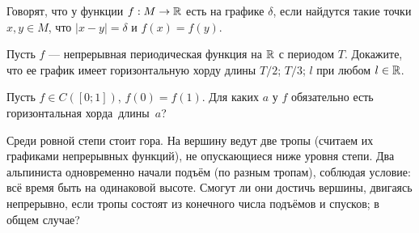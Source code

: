 \documentclass[a4paper,11pt]{article}
\begin{document}
%






%


Говорят, что
у функции $f:M\rightarrow\mathbb{R}$ есть на графике  $\delta$,
если найдутся такие точки $x,y\in M$, что $|x-y|=\delta$ и
$f(x)=f(y).$

Пусть $f$ --- непрерывная периодическая функция на $\mathbb{R}$ с периодом $T$. Докажите, что ее график имеет горизонтальную хорду длины %
 $T/2$;
 $T/3$;
 $l$ при любом $l\in\mathbb{R}$.

Пусть $f\in C([0;1])$, $f(0)=f(1)$.
Для каких $a$ у $f$ обязательно есть %
горизонтальная хорда~длины~$a$?




Среди ровной степи стоит гора. На вершину ведут две тропы
(считаем их графиками непрерывных функций),
не опускающиеся ниже уровня степи.
Два альпиниста одновременно начали подъ\"ем (по разным тропам),
соблюдая условие:
вс\"е время быть на одинаковой высоте.
Смогут ли они %
достичь вершины, двигаясь непрерывно, если
тропы состоят из конечного числа подъ\"емов и спусков;
 в общем случае?
\end{document}
